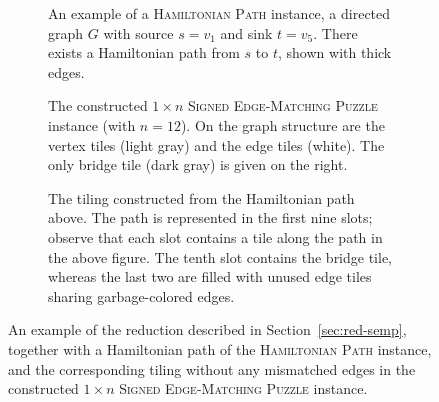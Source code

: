 \documentclass[11pt]{article}
\begin{document}
\begin{figure}%
	\centering
	\begin{subfigure}[c]{\textwidth}
		\centering
		
		\caption{An example of a \textsc{Hamiltonian Path} instance, a directed graph $G$ with source $s=v_1$ and sink $t=v_5$. There exists a Hamiltonian path from $s$ to $t$, shown with thick edges.}
		\label{fig:graph2}
		\vspace{12pt}
	\end{subfigure}
	\begin{subfigure}[c]{\textwidth}
		\centering
		\scalebox{0.8}{}
		\caption{The constructed \textsc{$1 \times n$ Signed Edge-Matching Puzzle} instance (with $n=12$). On the graph structure are the vertex tiles (light gray) and the edge tiles (white). The only bridge tile (dark gray) is given on the right.}
		\label{fig:graph-overlaid2}
		\vspace{12pt}
	\end{subfigure}
	\begin{subfigure}[c]{\textwidth}
		\centering
		\scalebox{0.8}{}
		\caption{The tiling constructed from the Hamiltonian path above. The path is represented in the first nine slots; observe that each slot contains a tile along the path in the above figure. The tenth slot contains the bridge tile, whereas the last two are filled with unused edge tiles sharing garbage-colored edges.}
		\label{fig:tiling2}
	\end{subfigure}

	\caption{An example of the reduction described in Section~\ref{sec:red-semp}, together with a Hamiltonian path of the \textsc{Hamiltonian Path} instance, and the corresponding tiling without any mismatched edges in the constructed \textsc{$1\times n$ Signed Edge-Matching Puzzle} instance.}
	\label{fig:reduction}
\end{figure}
\end{document}
